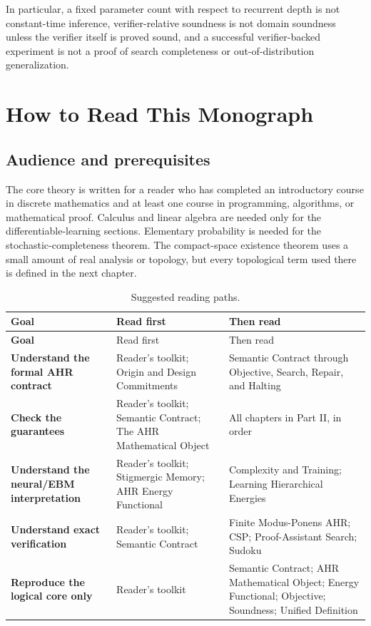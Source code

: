 \documentclass[11pt,oneside]{book}
\theoremstyle{remark}
\begin{document}
In particular, a fixed parameter count with respect to recurrent depth is not constant-time inference, verifier-relative soundness is not domain soundness unless the verifier itself is proved sound, and a successful verifier-backed experiment is not a proof of search completeness or out-of-distribution generalization.

\tableofcontents
\listoffigures
\listoftables

\chapter*{How to Read This Monograph}

\section*{Audience and prerequisites}

The core theory is written for a reader who has completed an introductory
course in discrete mathematics and at least one course in programming,
algorithms, or mathematical proof. Calculus and linear algebra are needed only
for the differentiable-learning sections. Elementary probability is needed for
the stochastic-completeness theorem. The compact-space existence theorem uses
a small amount of real analysis or topology, but every topological term used
there is defined in the next chapter.

\begin{longtable}{>{\bfseries\RaggedRight\arraybackslash}p{}
>{\RaggedRight\arraybackslash}p{}
>{\RaggedRight\arraybackslash}p{}}
\caption{Suggested reading paths.}\\
\toprule
Goal & Read first & Then read \\
\midrule
\endfirsthead
\toprule
Goal & Read first & Then read \\
\midrule
\endhead
Understand the formal AHR contract & Reader's toolkit; Origin and Design Commitments & Semantic Contract through Objective, Search, Repair, and Halting \\
Check the guarantees & Reader's toolkit; Semantic Contract; The AHR Mathematical Object & All chapters in Part II, in order \\
Understand the neural/EBM interpretation & Reader's toolkit; Stigmergic Memory; AHR Energy Functional & Complexity and Training; Learning Hierarchical Energies \\
Understand exact verification & Reader's toolkit; Semantic Contract & Finite Modus-Ponens AHR; CSP; Proof-Assistant Search; Sudoku \\
Reproduce the logical core only & Reader's toolkit & Semantic Contract; AHR Mathematical Object; Energy Functional; Objective; Soundness; Unified Definition \\
\bottomrule
\end{longtable}
\end{document}
